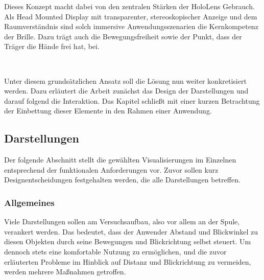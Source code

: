 Dieses Konzept macht dabei von den zentralen Stärken der HoloLens Gebrauch. Als Head Mounted Display mit transparenter, stereoskopischer Anzeige und dem Raumverständnis sind solch immersive Anwendungsszenarien die Kernkompetenz der Brille. Dazu trägt auch die Bewegungsfreiheit sowie der Punkt, dass der Träger die Hände frei hat, bei.

\vspace{8px}
\begin{center}
	\\
\end{center}
\vspace{6px}


Unter diesem grundsätzlichen Ansatz soll die Lösung nun weiter konkretisiert werden. Dazu erläutert die Arbeit zunächst das Design der Darstellungen und darauf folgend die Interaktion. Das Kapitel schließt mit einer kurzen Betrachtung der Einbettung dieser Elemente in den Rahmen einer Anwendung.

\subsection{Darstellungen}
Der folgende Abschnitt stellt die gewählten Visualisierungen im Einzelnen entsprechend der funktionalen Anforderungen vor. Zuvor sollen kurz Designentscheidungen festgehalten werden, die alle Darstellungen betreffen.\\

\subsubsection{Allgemeines} %
Viele Darstellungen sollen am Versuchsaufbau, also vor allem an der Spule, verankert werden. Das bedeutet, dass der Anwender Abstand und Blickwinkel zu diesen Objekten durch seine Bewegungen und Blickrichtung selbst steuert. Um dennoch stets eine komfortable Nutzung zu ermöglichen, und die zuvor erläuterten Probleme im Hinblick auf Distanz und Blickrichtung zu vermeiden, werden mehrere Maßnahmen getroffen.\\

